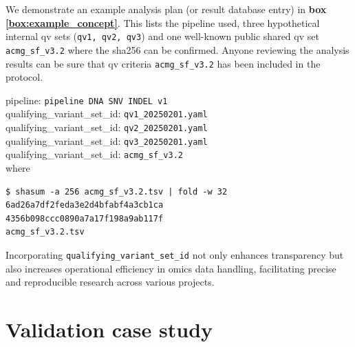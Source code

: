 We demonstrate an example analysis plan (or result database entry) in \textbf{box \ref{box:example_concept}}. 
This lists the pipeline used, three hypothetical internal \ac{qv} sets (\texttt{qv1, qv2, qv3}) and one well-known public shared \ac{qv} set \texttt{acmg\_sf\_v3.2}  where the sha256 can be confirmed.
Anyone reviewing the analysis results can be sure that \ac{qv} criteria \texttt{acmg\_sf\_v3.2} has been included in the protocol.

\begin{tcolorbox}[
    colback=white!0,  %
    colframe=black,  %
    boxrule=1pt,  %
    arc=1mm,  %
    outer arc=1mm,
   title=\textbf{\refstepcounter{myboxcounter}\label{box:example_concept}Box \themyboxcounter: Example implementation}
]

pipeline: \colorbox{colorSUNSET1!30}{\texttt{pipeline DNA SNV INDEL v1}}\\
qualifying\_variant\_set\_id: \colorbox{colorSUNSET2!60}{\texttt{qv1\_20250201.yaml}}\\
qualifying\_variant\_set\_id: \colorbox{colorSUNSET2!60}{\texttt{qv2\_20250201.yaml}}\\
qualifying\_variant\_set\_id: \colorbox{colorSUNSET2!60}{\texttt{qv3\_20250201.yaml}}\\
qualifying\_variant\_set\_id: \colorbox{colorSUNSET2!60}{\texttt{acmg\_sf\_v3.2}}\\

where 
\begin{verbatim}
$ shasum -a 256 acmg_sf_v3.2.tsv | fold -w 32
6ad26a7df2feda3e2d4bfabf4a3cb1ca
4356b098ccc0890a7a17f198a9ab117f
acmg_sf_v3.2.tsv
\end{verbatim}
\end{tcolorbox}

Incorporating \texttt{qualifying\_variant\_set\_id} not only enhances transparency but also increases operational efficiency in omics data handling, facilitating precise and reproducible research across various projects.

\section{Validation case study}


